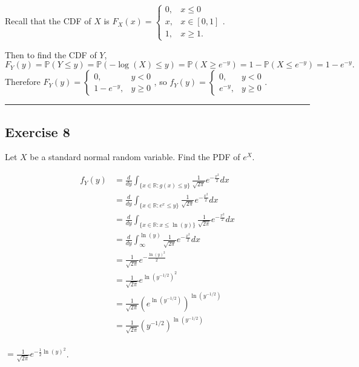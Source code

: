 \documentclass{article}
\theoremstyle{break}
\newenvironment{solution}{{\bf Solution:}}{\hfill\rule{2mm}{2mm}}
\newcommand{\R}{\mathbb{R}}
\renewcommand{\P}{\mathbb{P}}
\begin{document}
\begin{solution}

Recall that the CDF of $X$ is $F_X(x) = \begin{cases}
0, & x \leq 0 \\
x, & x \in [0,1] \\
1, & x \geq 1.
\end{cases}$.

Then to find the CDF of $Y$,
\[ F_Y(y) = \P(Y \leq y) = \P(- \log(X) \leq y) = \P(X \geq e^{-y}) = 1 - \P(X \leq e^{-y}) = 1 - e^{-y}.
\]
Therefore $F_Y(y) = \begin{cases}
0, & y < 0 \\
1 - e^{-y}, & y \geq 0
\end{cases}
$, so $f_Y(y) = \begin{cases}
0, & y < 0 \\
e^{-y}, & y \geq 0
\end{cases}
$.



\end{solution}


\subsection*{Exercise 8}
Let $X$ be a standard normal random variable. Find the PDF of $e^X$. 

\begin{align*}
f_Y(y) &= \frac{d}{dy} \int_{\{x \in \R : g(x) \leq y \}} \frac{1}{\sqrt{2 \pi}} e ^{-\frac{x^2}{2}} dx \\
	&= \frac{d}{dy} \int_{\{x \in \R : e^x \leq y \}} \frac{1}{\sqrt{2 \pi}} e ^{-\frac{x^2}{2}} dx \\
	 &= \frac{d}{dy} \int_{\{x \in \R : x \leq \ln(y) \}} \frac{1}{\sqrt{2 \pi}} e ^{-\frac{x^2}{2}} dx \\
	  &= \frac{d}{dy} \int_{\infty}^{\ln(y)} \frac{1}{\sqrt{2 \pi}} e ^{-\frac{x^2}{2}} dx \\
	  &= \frac{1}{\sqrt{2 \pi}} e ^{- \frac{\ln(y)^2}{2}} \\
	  &= \frac{1}{\sqrt{2 \pi}} e ^{ \ln (y^{-1/2})^2} \\
	  &= \frac{1}{\sqrt{2 \pi}} \left( e ^{ \ln (y^{-1/2})} \right)^{ \ln (y^{-1/2})} \\
	  &= \frac{1}{\sqrt{2 \pi}} \left( y^{-1/2} \right)^{ \ln (y^{-1/2})} \\
\end{align*}


$ = \frac{1}{\sqrt{2 \pi}} e^{-\frac{1}{2} \ln(y)^2}$.
\end{document}
